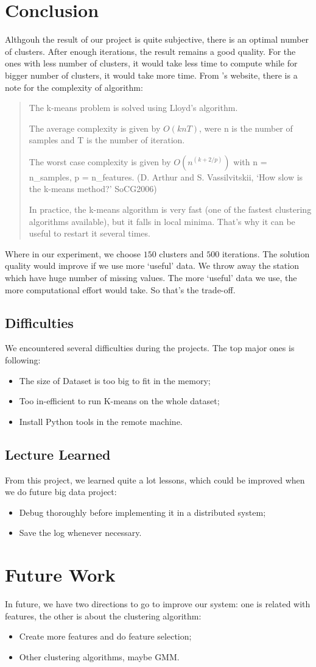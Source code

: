 \section{Conclusion}

Althgouh the result of our project is quite subjective, there is an optimal number of clusters. After enough iterations, the result remains a good quality. For the ones with less number of clusters, it would take less time to compute while for bigger number of clusters, it would take more time. From \cite{sklearn}'s website, there is a note for the complexity of algorithm:
\begin{quote}
The k-means problem is solved using Lloyd’s algorithm.

The average complexity is given by $O(k n T)$, were n is the number of samples and T is the number of iteration.

The worst case complexity is given by $O(n^{(k+2/p)})$ with n = n\_samples, p = n\_features. (D. Arthur and S. Vassilvitskii, `How slow is the k-means method?' SoCG2006)

In practice, the k-means algorithm is very fast (one of the fastest clustering algorithms available), but it falls in local minima. That’s why it can be useful to restart it several times.
\end{quote}
Where in our experiment, we choose $150$ clusters and $500$ iterations. The solution quality would improve if we use more `useful' data. We throw away the station which have huge number of missing values. The more `useful' data we use, the more computational effort would take. So that's the trade-off.

\subsection{Difficulties}
We encountered several difficulties during the projects. The top major ones is following:
\begin{itemize}
    \item The size of Dataset is too big to fit in the memory;
    \item Too in-efficient to run K-means on the whole dataset;
    \item Install Python tools in the remote machine.
\end{itemize}

\subsection{Lecture Learned}
From this project, we learned quite a lot lessons, which could be improved when we do future big data project:
\begin{itemize}
    \item Debug thoroughly before implementing it in a distributed system;
    \item Save the log whenever necessary.
\end{itemize}

\section{Future Work}
In future, we have two directions to go to improve our system: one is related with features, the other is about the clustering algorithm:
\begin{itemize}
    \item Create more features and do feature selection;
    \item Other clustering algorithms, maybe GMM.
\end{itemize}
